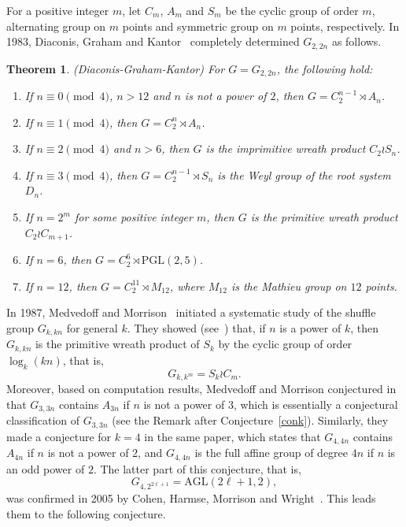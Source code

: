 \documentclass[11pt,a4paper,reqno]{amsart}
\newcommand{\A}{A}
\newcommand{\AGL}{\mathrm{AGL}}
\newcommand{\PGL}{\mathrm{PGL}}
\newcommand{\Sy}{S}
\newtheorem{theorem}{Theorem}[section]
\theoremstyle{definition}
\newtheorem*{remark}{Remark}
\begin{document}
For a positive integer $m$, let $C_m$, $A_m$ and $S_m$ be the cyclic group of order $m$, alternating group on $m$ points and symmetric group on $m$ points, respectively.
In 1983, Diaconis, Graham and Kantor~\cite{DGK1983} completely determined $G_{2,2n}$ as follows.

\begin{theorem}\label{thm:2k}
\emph{(Diaconis-Graham-Kantor)} For $G=G_{2,2n}$, the following hold:
  \begin{enumerate}[\rm(a)]
    \item If $n\equiv 0\pmod{4}$, $n>12$ and $n$ is not a power of $2$, then $G=C^{n-1}_2\rtimes A_n$.
    \item If $n\equiv 1\pmod{4}$, then $G=C^n_2\rtimes A_n$.
    \item If $n\equiv 2\pmod{4}$ and $n>6$, then $G$ is the imprimitive wreath product $C_2\wr S_n$.
    \item If $n\equiv 3\pmod{4}$, then $G=C^{n-1}_2\rtimes S_n$ is the Weyl group of the root system $D_n$.
    \item If $n=2^m$ for some positive integer $m$, then $G$ is the primitive wreath product $C_2\wr C_{m+1}$.
    \item If $n=6$, then $G=C_2^6\rtimes \PGL(2,5)$.
    \item If $n=12$, then $G=C_2^{11}\rtimes M_{12}$, where $M_{12}$ is the Mathieu group on $12$ points.
  \end{enumerate}
\end{theorem}
%

In 1987, Medvedoff and Morrison~\cite{MM1987} initiated a systematic study of the shuffle group $G_{k,kn}$ for general $k$. They showed (see~\cite[Theorem~2]{MM1987}) that, if $n$ is a power of $k$, then $G_{k,kn}$ is the primitive wreath product of $\Sy_k$ by the cyclic group of order $\log_k(kn)$, that is,
\begin{equation}\label{eq:wr}
      G_{k,k^m}=S_k\wr C_m.
\end{equation}
 Moreover, based on computation results, Medvedoff and Morrison conjectured in~\cite{MM1987} that $G_{3,3n}$ contains $\A_{3n}$ if $n$ is not a power of $3$, which is essentially a conjectural classification of $G_{3,3n}$ (see the Remark after Conjecture~\ref{conk}). Similarly, they made a conjecture for $k=4$ in the same paper, which states that $G_{4,4n}$ contains $\A_{4n}$ if $n$ is not a power of $2$, and $G_{4,4n}$ is the full affine group of degree $4n$ if $n$ is an odd power of $2$.
The latter part of this conjecture, that is,
\begin{equation}\label{eq:aff}
      G_{4,2^{2\ell+1}}=\AGL(2\ell+1,2),
\end{equation} was confirmed in 2005 by Cohen, Harmse, Morrison and Wright~\cite[Theorem~2.6]{CHMW2005}. This leads them to the following conjecture.
\end{document}
